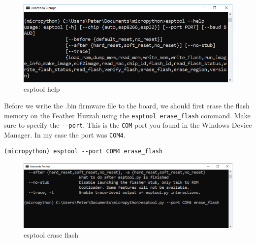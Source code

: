 \documentclass{book}
\makeatletter
\def\maxwidth{\ifdim\Gin@nat@width>\linewidth\linewidth
    \else\Gin@nat@width\fi}
\let\Oldincludegraphics\includegraphics
\renewcommand{\includegraphics}[1]{\Oldincludegraphics[width=.8\maxwidth]{#1}}
\makeatother
\begin{document}
\begin{figure}
\centering
\includegraphics{images/esptool_help.PNG}
\caption{esptool help}
\end{figure}

Before we write the .bin firmware file to the board, we should first
erase the flash memory on the Feather Huzzah using the
\lstinline!esptool erase_flash! command. Make sure to specify the
\lstinline!--port!. This is the \lstinline!COM! port you found in the
Windows Device Manager. In my case the port was \lstinline!COM4!.

\begin{lstlisting}
(micropython) esptool --port COM4 erase_flash
\end{lstlisting}

\begin{figure}
\centering
\includegraphics{images/esptool_erase_flash.PNG}
\caption{esptool erase flash}
\end{figure}
\end{document}
